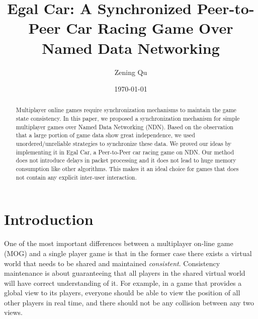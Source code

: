 \documentclass{article}
\begin{document}
\title{Egal Car: A Synchronized Peer-to-Peer Car Racing Game Over Named Data Networking}
\author{Zening Qu}
\date{\today}
\maketitle

\begin{abstract}
Multiplayer online games require synchronization mechanisms to maintain the game state consistency. In this paper, we proposed a synchronization mechanism for simple multiplayer games over Named Data Networking (NDN). Based on the observation that a large portion of game data show great independence, we used unordered\slash unreliable strategies to synchronize these data. We proved our ideas by implementing it in Egal Car, a Peer-to-Peer car racing game on NDN. Our method does not introduce delays in packet processing and it does not lead to huge memory consumption like other algorithms. This makes it an ideal choice for games that does not contain any explicit inter-user interaction.
\end{abstract}

\section{Introduction}
\label{introduction}

One of the most important differences between a multiplayer on-line game (MOG) and a single player game is that in the former case there exists a virtual world that needs to be shared and maintained \emph{consistent}. Consistency maintenance is about guaranteeing that all players in the shared virtual world will have correct understanding of it. For example, in a game that provides a global view to its players, everyone should be able to view the position of all other players in real time, and there should not be any collision between any two views. 
\end{document}
